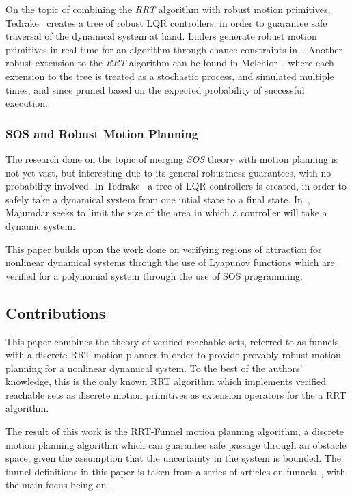 On the topic of combining the \textit{RRT} algorithm with robust motion
primitives, Tedrake~\cite{tedrakeLQRtreesFeedbackMotion2009} creates a tree of
robust LQR controllers, in order to guarantee safe traversal of the dynamical
system at hand. Luders generate robust motion primitives in real-time for an
 algorithm through chance constraints in~\cite{luders2013robust}.
Another robust extension to the \textit{RRT} algorithm can be found in
Melchior~\cite{melchior2007particle}, where each extension to the tree is
treated as a stochastic process, and simulated multiple times, and since pruned
based on the expected probability of successful execution.


\subsubsection{SOS and Robust Motion Planning}

The research done on the topic of merging \textit{SOS} theory with motion
planning is not yet vast, but interesting due to its general robustness
guarantees, with no probability involved. In
Tedrake~\cite{tedrakeLQRtreesFeedbackMotion2009} a tree of LQR-controllers is
created, in order to safely take a dynamical system from one intial state to a
final state. In~\cite{majumdarFunnelLibrariesRealtime2017}, Majumdar seeks to
limit the size of the area in which a controller will take a dynamic system.


This paper builds upon the work done on verifying regions of attraction for
nonlinear dynamical systems through the use of Lyapunov functions which are
verified for a polynomial system through the use of SOS programming.

\subsection{Contributions}

This paper combines the theory of verified reachable sets, referred to as
funnels, with a discrete RRT motion planner in order to provide provably robust
motion planning for a nonlinear dynamical system. To the best of the authors'
knowledge, this is the only known RRT algorithm which implements verified
reachable sets as discrete motion primitives as extension operators for the a
RRT algorithm.

The result of this work is the RRT-Funnel motion planning algorithm, a discrete
motion planning algorithm which can guarantee safe passage through an obstacle
space, given the assumption that the uncertainty in the system is bounded. The
funnel definitions in this paper is taken from a series of articles on
funnels~\cite{Tobenkin_2011,tedrakeLQRtreesFeedbackMotion2009,
  majumdarRobustOnlineMotion2013,
  majumdarFunnelLibrariesRealtime2017,ahmadi2014dsos}, with the main focus being
on \cite{majumdarFunnelLibrariesRealtime2017}.



